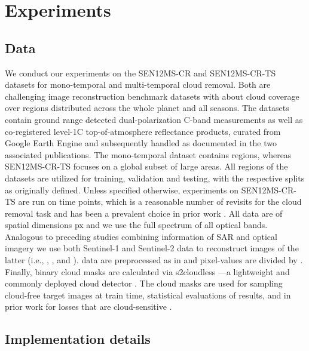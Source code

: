 \documentclass[10pt,twocolumn,letterpaper]{article}
\begin{document}
\section{Experiments}

\subsection{Data} \label{sub:data}
We conduct our experiments on the SEN12MS-CR \cite{ebel2020multisensor} and SEN12MS-CR-TS \cite{ebel2022sen12ms} datasets for mono-temporal and multi-temporal cloud removal. Both are challenging image reconstruction benchmark datasets with about  cloud coverage over regions distributed across the whole planet and all seasons. The datasets contain ground range detected dual-polarization C-band  measurements as well as co-registered level-1C top-of-atmosphere reflectance  products, curated from Google Earth Engine \cite{gorelick2017google} and subsequently handled as documented in the two associated publications. 
The mono-temporal dataset contains  regions, whereas SEN12MS-CR-TS focuses on a global subset of  large areas. All regions of the datasets are utilized for training, validation and testing, with the respective splits as originally defined. Unless specified otherwise, experiments on SEN12MS-CR-TS are run on  time points, which is a reasonable number of revisits for the cloud removal task and has been a prevalent choice in prior work \cite{Sarukkai_Jain_Uzkent_Ermon_2019, ebel2022sen12ms, sebastianelli2022plfm}. All data are of spatial dimensions  px and we use the full spectrum of all  optical bands. Analogous to preceding studies combining information of SAR and optical imagery \cite{eckardt2013removal, huang2015sar, meraner2020cloud, ebel2022sen12ms, xu2022glf} we use both Sentinel-1 and Sentinel-2 data to reconstruct images of the latter (i.e., , , and ). 
 data are preprocessed as in \cite{ebel2020multisensor, ebel2022sen12ms} and  pixel-values are divided by . 
Finally, binary cloud masks are calculated via s2cloudless \cite{Zupanc}---a lightweight and commonly deployed cloud detector \cite{s2cloudlessGEE, skakun2022cloud}. The cloud masks are used for sampling cloud-free target images at train time, statistical evaluations of results, and in prior work for losses that are cloud-sensitive \cite{meraner2020cloud}.



\subsection{Implementation details}
\end{document}
